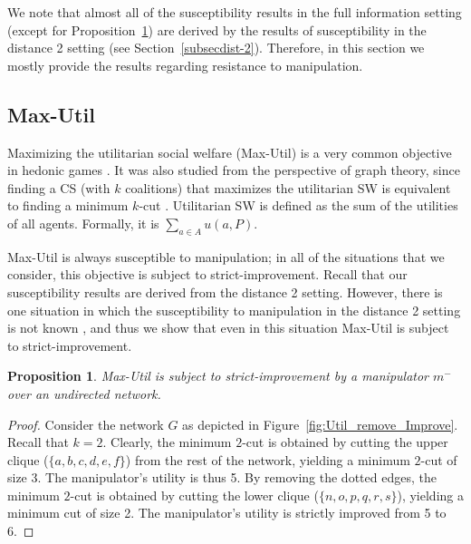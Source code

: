 \documentclass{article}
\newtheorem{proposition}{Proposition}
\begin{document}
We note that almost all of the susceptibility results in the full information setting (except for Proposition~\ref{Prop:util_full_info}) are derived by the results of susceptibility in the distance 2 setting (see Section~\ref{subsecdist-2}). Therefore, in this section we mostly provide the results regarding resistance to manipulation.

\subsection{Max-Util}
\label{sec:utilirarain}

Maximizing the utilitarian social welfare (Max-Util) is a very common objective in hedonic games \cite{aziz2015welfare}. It was also studied from the perspective of graph theory, since finding a CS (with $k$ coalitions) that maximizes the utilitarian SW is equivalent to finding a minimum $k$-cut \cite{branzei2009coalitional}.  
Utilitarian SW is defined as the sum of the utilities of all agents. Formally, it is $\underset{a\in A}{\sum}u(a,P)$.

Max-Util is always susceptible to manipulation; in all of the situations that we consider, this objective is subject to strict-improvement. 
Recall that our susceptibility results are derived from the distance 2 setting. However, there is one situation in which the susceptibility to manipulation in the distance 2 setting is not known 
, and thus we show that even in this situation Max-Util is subject to strict-improvement. 



\begin{proposition}
\label{Prop:util_full_info}
Max-Util is subject to strict-improvement by a manipulator $m^-$ over an undirected network.
\end{proposition}
\begin{proof}
Consider the network $G$ as depicted in Figure~\ref{fig:Util_remove_Improve}. Recall that $k=2$. Clearly, the minimum $2$-cut is obtained by cutting the upper clique ($\{a,b,c,d,e,f\}$) from the rest of the network, yielding a minimum $2$-cut of size 3. The manipulator's utility is thus 5. By removing the dotted edges, the minimum $2$-cut is obtained by cutting the lower clique ($\{n,o,p,q,r,s\}$), yielding a minimum cut of size 2. The manipulator's utility is strictly improved from 5 to 6.
\end{proof}
\end{document}
